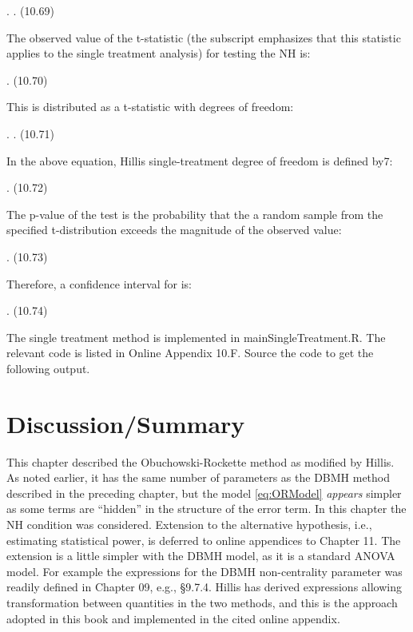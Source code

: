 \documentclass[
]{book}
\begin{document}
. . (10.69)

The observed value of the t-statistic (the subscript emphasizes that this statistic applies to the single treatment analysis) for testing the NH is:

. (10.70)

This is distributed as a t-statistic with degrees of freedom:

. . (10.71)

In the above equation, Hillis single-treatment degree of freedom is defined by7:

. (10.72)

The p-value of the test is the probability that the a random sample from the specified t-distribution exceeds the magnitude of the observed value:

. (10.73)

Therefore, a confidence interval for is:

. (10.74)

The single treatment method is implemented in mainSingleTreatment.R. The relevant code is listed in Online Appendix 10.F. Source the code to get the following output.

\hypertarget{discussionsummary}{%
\section{Discussion/Summary}\label{discussionsummary}}

This chapter described the Obuchowski-Rockette method as modified by Hillis. As noted earlier, it has the same number of parameters as the DBMH method described in the preceding chapter, but the model \eqref{eq:ORModel} \emph{appears} simpler as some terms are ``hidden'' in the structure of the error term. In this chapter the NH condition was considered. Extension to the alternative hypothesis, i.e., estimating statistical power, is deferred to online appendices to Chapter 11. The extension is a little simpler with the DBMH model, as it is a standard ANOVA model. For example the expressions for the DBMH non-centrality parameter was readily defined in Chapter 09, e.g., §9.7.4. Hillis has derived expressions allowing transformation between quantities in the two methods, and this is the approach adopted in this book and implemented in the cited online appendix.
\end{document}
